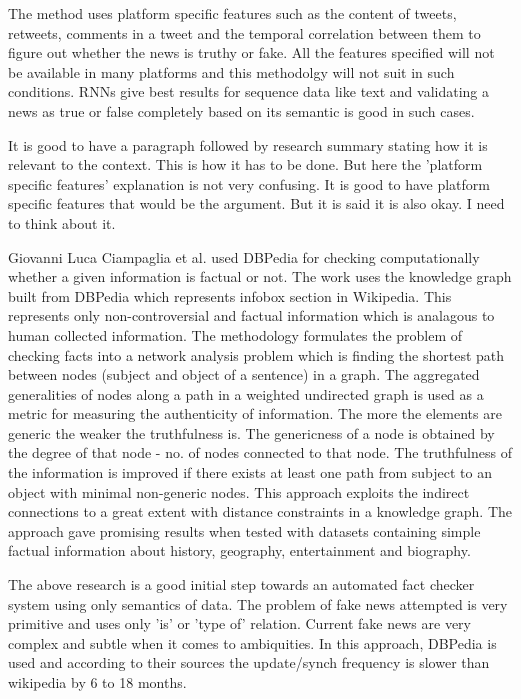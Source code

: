 \documentclass[a4paper, 11pt]{article}
\begin{document}
The method uses platform specific features such as the content of tweets, retweets, comments in a tweet and the temporal correlation between them to figure out whether the news is truthy or fake. All the features specified will not be available in many platforms and this methodolgy will not suit in such conditions. RNNs give best results for sequence data like text and validating a news as true or false completely based on its semantic is good in such cases.

\color{red}
It is good to have a paragraph followed by research summary stating how it is relevant to the context. This is how it has to be done. But here the 'platform specific features' explanation is not very confusing. It is good to have platform specific features that would be the argument. But it is said it is also okay. I need to think about it. 
\color{black}

Giovanni Luca Ciampaglia et al. used DBPedia for checking computationally whether a given information is factual or not. The work uses the knowledge graph built from DBPedia which represents infobox section in Wikipedia. This represents only non-controversial and factual information which is analagous to human collected information. The methodology formulates the problem of checking facts into a network analysis problem which is finding the shortest path between nodes (subject and object of a sentence) in a graph. The aggregated generalities of nodes along a path in a weighted undirected graph is used as a metric for measuring the authenticity of information. The more the elements are generic the weaker the truthfulness is.  The genericness of a node is obtained by the degree of that node - no. of nodes connected to that node. The truthfulness of the information is improved if there exists at least one path from subject to an object with minimal non-generic nodes. This approach exploits the indirect connections to a great extent with distance constraints in a knowledge graph. The approach gave promising results when tested with datasets containing simple factual information about history, geography, entertainment and biography\cite{Ciampaglia2015}. 

The above research is a good initial step towards an automated fact checker system using only semantics of data. The problem of fake news attempted is very primitive and uses only 'is' or 'type of' relation. Current fake news are very complex and subtle when it comes to ambiquities. In this approach, DBPedia is used and according to their sources the update/synch frequency is slower than wikipedia by 6 to 18 months.
\end{document}
